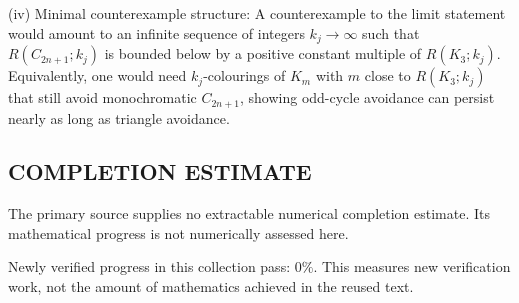 (iv) Minimal counterexample structure: A counterexample to the limit statement would amount to an infinite sequence of integers $k_j\to\infty$ such that $R(C_{2n+1};k_j)$ is bounded below by a positive constant multiple of $R(K_3;k_j)$. Equivalently, one would need $k_j$-colourings of $K_{m}$ with $m$ close to $R(K_3;k_j)$ that still avoid monochromatic $C_{2n+1}$, showing odd-cycle avoidance can persist nearly as long as triangle avoidance.



\subsection*{COMPLETION ESTIMATE}
The primary source supplies no extractable numerical completion estimate. Its mathematical progress is not numerically assessed here.

Newly verified progress in this collection pass: $0\%$. This measures new verification work, not the amount of mathematics achieved in the reused text.
